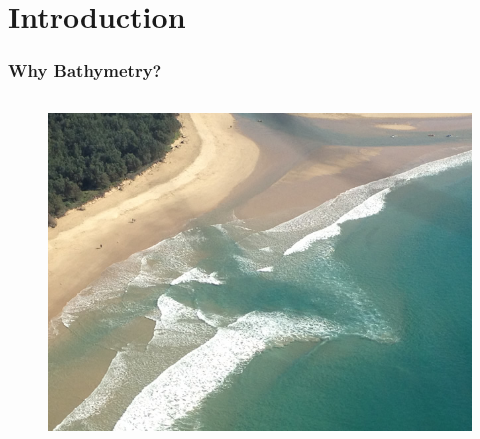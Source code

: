 \documentclass[7pt]{beamer}
\begin{document}
\section{Introduction }
\begin{frame}
\frametitle{Why Bathymetry?}
\begin{columns}

\begin{figure}[h!]
\includegraphics[width=.80\linewidth]{img/Rip_C.jpg}\hfill
\end{figure}


\end{columns}
\end{frame}
\end{document}

